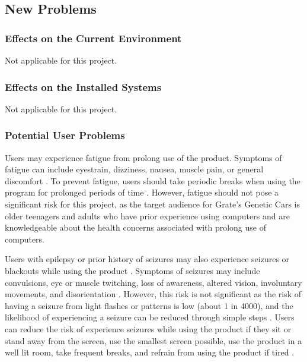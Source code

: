 \documentclass[12pt, titlepage]{article}
\begin{document}
\subsection{New Problems}

\subsubsection{Effects on the Current Environment}
Not applicable for this project.

\subsubsection{Effects on the Installed Systems}
Not applicable for this project.

\subsubsection{Potential User Problems}
Users may experience fatigue from prolong use of the product. Symptoms of 
fatigue can include eyestrain, dizziness, nausea, muscle pain, or general 
discomfort \citep{nintendo}. To prevent fatigue, users should take periodic breaks when using the 
program for prolonged periods of time \citep{nintendo}. However, fatigue should not pose a 
significant risk for this project, as the target audience for Grate's Genetic 
Cars is older teenagers and adults who have prior experience using computers and 
are  knowledgeable about the health concerns associated with prolong use of 
computers.

Users with epilepsy or prior history of seizures may also experience seizures or 
blackouts while using the product \citep{nintendo}. Symptoms of seizures may include convulsions, 
eye or muscle twitching, loss of awareness, altered vision, involuntary 
movements, and disorientation \citep{nintendo}. However, this risk is not significant as the risk 
of having a seizure from light flashes or patterns is low (about 1 in 4000), and 
the likelihood of experiencing a seizure can be reduced through simple steps \citep{nintendo}. 
Users can reduce the risk of experience seizures while using the product if they 
sit or stand away from the screen, use the smallest screen possible, use the 
product in a well lit room, take frequent breaks, and refrain from using the 
product if tired \citep{nintendo}.
\end{document}
